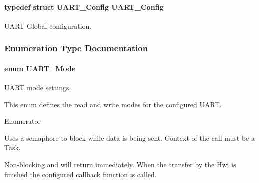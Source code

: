 \paragraph[{U\-A\-R\-T\-\_\-\-Config}]{\setlength{\rightskip}{0pt plus 5cm}typedef struct {\bf U\-A\-R\-T\-\_\-\-Config}  {\bf U\-A\-R\-T\-\_\-\-Config}}\label{_u_a_r_t_8h_ae513322c7d3184d66173cba9349989a4}


U\-A\-R\-T Global configuration. 



\subsubsection{Enumeration Type Documentation}
\paragraph[{U\-A\-R\-T\-\_\-\-Mode}]{\setlength{\rightskip}{0pt plus 5cm}enum {\bf U\-A\-R\-T\-\_\-\-Mode}}\label{_u_a_r_t_8h_a2507a620dba95cd20885c52494d19e90}


U\-A\-R\-T mode settings. 

This enum defines the read and write modes for the configured U\-A\-R\-T. \begin{Desc}
\item[Enumerator]\par
\begin{description}
\item[{\em 
U\-A\-R\-T\-\_\-\-M\-O\-D\-E\-\_\-\-B\-L\-O\-C\-K\-I\-N\-G\label{_u_a_r_t_8h_a2507a620dba95cd20885c52494d19e90ae6b6bd5d2d5df859ad6724e89e605ebf}
}]Uses a semaphore to block while data is being sent. Context of the call must be a Task. \item[{\em 
U\-A\-R\-T\-\_\-\-M\-O\-D\-E\-\_\-\-C\-A\-L\-L\-B\-A\-C\-K\label{_u_a_r_t_8h_a2507a620dba95cd20885c52494d19e90ae0dbd9b5195e56c3c2aed10163523754}
}]Non-\/blocking and will return immediately. When the transfer by the Hwi is finished the configured callback function is called. \end{description}
\end{Desc}
